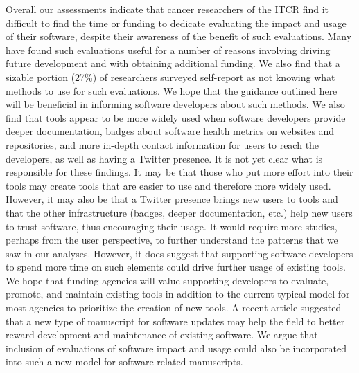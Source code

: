 \documentclass{article}
\begin{document}
Overall our assessments indicate that cancer researchers of the ITCR find it difficult to find the time or funding to dedicate evaluating the impact and usage of their software, despite their awareness of the benefit of such evaluations. Many have found such evaluations useful for a number of reasons involving driving future development and with obtaining additional funding. We also find that a sizable portion (27\%) of researchers surveyed self-report as not knowing what methods to use for such evaluations. We hope that the guidance outlined here will be beneficial in informing software developers about such methods.  We also find that tools appear to be more widely used when software developers provide deeper documentation, badges about software health metrics on websites and repositories, and more in-depth contact information for users to reach the developers, as well as having a Twitter presence. It is not yet clear what is responsible for these findings. It may be that those who put more effort into their tools may create tools that are easier to use and therefore more widely used. However, it may also be that a Twitter presence brings new users to tools and that the other infrastructure (badges, deeper documentation, etc.) help new users to trust software, thus encouraging their usage. It would require more studies, perhaps from the user perspective, to further understand the patterns that we saw in our analyses. However, it does suggest that supporting software developers to spend more time on such elements could drive further usage of existing tools. We hope that funding agencies will value supporting developers to evaluate, promote, and maintain existing tools in addition to the current typical model for most agencies to prioritize the creation of new tools. A recent article \cite{merow_better_2023} suggested that a new type of manuscript for software updates may help the field to better reward development and maintenance of existing software. We argue that inclusion of evaluations of software impact and usage could also be incorporated into such a new model for software-related manuscripts. 
\end{document}
